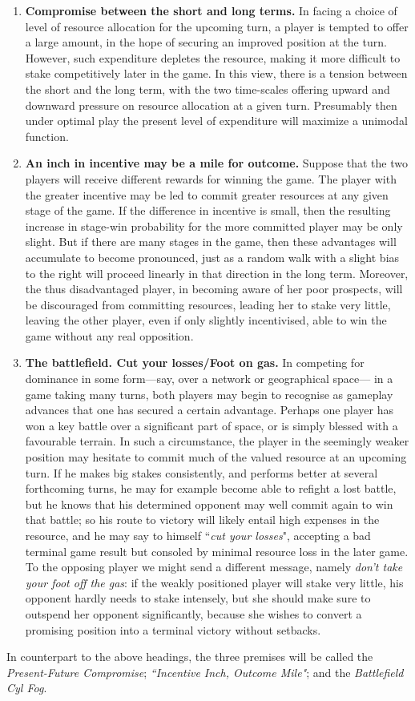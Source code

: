 \documentclass[letterpaper,11pt,oneside,reqno]{amsbook}
\numberwithin{figure}{chapter}
\theoremstyle{definition}
\theoremstyle{definition}
\theoremstyle{definition}
\theoremstyle{definition}
\theoremstyle{definition}
\begin{document}
\begin{enumerate}
\item
{\bf Compromise between the short and long terms.} In facing a choice of level of resource allocation for the upcoming turn, a player is tempted to offer a large amount, in the hope of securing an improved position at the turn. However, such expenditure  depletes the resource, making it more difficult to stake competitively later in the game. In this view, there is a tension between the short and the long term, with the two time-scales offering upward and downward pressure on resource allocation at a given turn. Presumably then under optimal play the present level of expenditure will maximize a unimodal function. 
\item {\bf An inch in incentive may be a mile for outcome.}
Suppose that the two players will receive different rewards for winning the game. The player with the greater incentive may be led to commit greater resources at any given stage of the game. If the difference in incentive is small, then the resulting increase in stage-win probability for the more committed player may be only slight. But if there are many stages in the game, then these advantages will accumulate to become pronounced, just as a random walk with a slight bias to the right will proceed linearly in that direction in the long term. Moreover, the thus disadvantaged player, in becoming aware of her poor prospects, will be discouraged from committing resources, leading her to stake very little, leaving the other player, even if only slightly incentivised, able to win the game without any real opposition.  
\item {\bf The battlefield. Cut your losses/Foot on gas.} In competing for dominance in some form---say, over a network or geographical space--- in a game taking many turns, both players may begin to recognise as gameplay advances that one has secured a certain advantage. Perhaps one player has won a key battle over a significant part of space, or is simply blessed with a favourable terrain. In such a circumstance, the player in the seemingly weaker position may hesitate to commit much of the valued resource at an upcoming turn. If he makes big stakes consistently, and  performs better at several forthcoming turns, he may for example become able to refight a lost battle, but he knows that his determined opponent may well commit again to win that battle; so his route to victory will likely entail high expenses in the resource, and he may say to himself ``{\em cut your losses}", 
accepting a bad terminal game result but consoled by minimal resource loss in the later game.
To the opposing player we might send a different message, namely {\em don't take your foot off the gas}: if the weakly positioned player will stake very little, his opponent hardly needs to stake intensely, but she should make sure to outspend her opponent significantly, because she wishes to convert a promising position into a terminal victory without setbacks. 
\end{enumerate}
In counterpart to the above headings, the three premises will be called the {\em Present-Future Compromise}; {\em ``Incentive Inch, Outcome Mile"}; and the {\em Battlefield Cyl Fog}.
\end{document}
